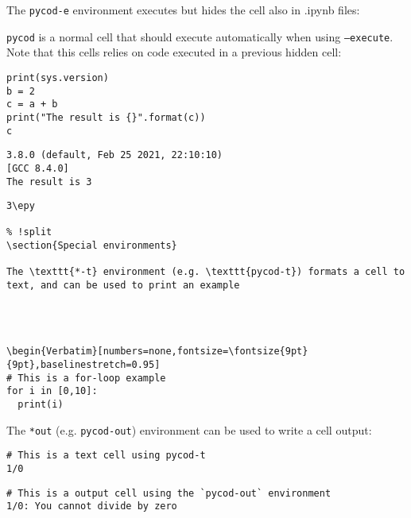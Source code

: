 \documentclass[%
oneside,                 %
final,                   %
chapterprefix=true,      %
open=right,              %
10pt]{book}
\begin{document}
The \texttt{pycod-e} environment executes but hides the cell also in .ipynb files:







\texttt{pycod} is a normal cell that should execute automatically when using \texttt{--execute}. Note that this cells relies on code executed in a previous hidden cell:






\begin{Verbatim}[numbers=none,fontsize=\fontsize{9pt}{9pt},baselinestretch=0.95]
print(sys.version)
b = 2
c = a + b
print("The result is {}".format(c))
c

\end{Verbatim}

\begin{Verbatim}[numbers=none,fontsize=\fontsize{9pt}{9pt},baselinestretch=0.95]
3.8.0 (default, Feb 25 2021, 22:10:10) 
[GCC 8.4.0]
The result is 3
\end{Verbatim}
\begin{Verbatim}[numbers=none,fontsize=\fontsize{9pt}{9pt},baselinestretch=0.95]
3\epy

% !split
\section{Special environments}

The \texttt{*-t} environment (e.g. \texttt{pycod-t}) formats a cell to text, and can be used to print an example




\begin{Verbatim}[numbers=none,fontsize=\fontsize{9pt}{9pt},baselinestretch=0.95]
# This is a for-loop example
for i in [0,10]:
  print(i)

\end{Verbatim}


The \texttt{*out}  (e.g. \texttt{pycod-out}) environment can be used to write a cell output:



\begin{Verbatim}[numbers=none,fontsize=\fontsize{9pt}{9pt},baselinestretch=0.95]
# This is a text cell using pycod-t
1/0

\end{Verbatim}




\begin{Verbatim}[numbers=none,fontsize=\fontsize{9pt}{9pt},baselinestretch=0.95]
# This is a output cell using the `pycod-out` environment
1/0: You cannot divide by zero

\end{Verbatim}
\end{document}
